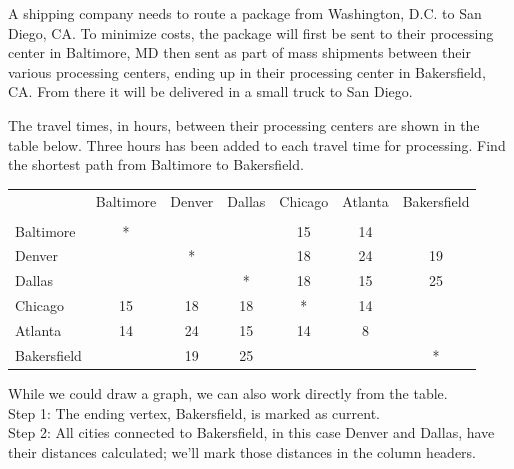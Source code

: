 \begin{example}{}{}
A shipping company needs to route a package from Washington, D.C. to San Diego, CA.  To minimize costs, the package will first be sent to their processing center in Baltimore, MD then sent as part of mass shipments between their various processing centers, ending up in their processing center in Bakersfield, CA.  From there it will be delivered in a small truck to San Diego.  

The travel times, in hours, between their processing centers are shown in the table below.  Three hours has been added to each travel time for processing.  Find the shortest path from Baltimore to Bakersfield.
 \begin{center}
 \begin{tabular}{|l|c|c|c|c|c|c|}
 \hline
 & Baltimore & Denver & Dallas & Chicago & Atlanta & Bakersfield\\
 &&&&&&\\
 \hline
 Baltimore & * &&&15&14&\\
 \hline
 Denver &&*&&18&24&19\\
 \hline
Dallas&&&*&18&15&25\\
 \hline
 Chicago &15&18&18&*&14&\\
 \hline
 Atlanta & 14 & 24&15&14&8&\\
 \hline
 Bakersfield &&19&25&&&*\\
 \hline
 \end{tabular}
 \end{center}


While we could draw a graph, we can also work directly from the table. \\

\noindent Step 1:  The ending vertex, Bakersfield, is marked as current.\\

\noindent Step 2:  All cities connected to Bakersfield, in this case Denver and Dallas, have their distances calculated; we'll mark those distances in the column headers.  \\


\end{example}
